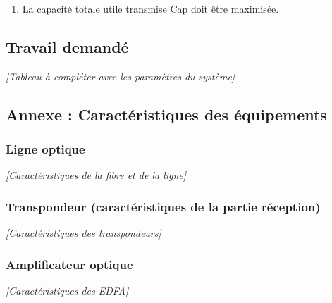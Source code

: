 \documentclass[a4paper,11pt]{article}
\begin{document}
\begin{enumerate}
    \item La capacité totale utile transmise Cap doit être maximisée.
\end{enumerate}

\subsection*{Travail demandé}

\textit{[Tableau à compléter avec les paramètres du système]}

\subsection*{Annexe : Caractéristiques des équipements}

\subsubsection*{Ligne optique}
\textit{[Caractéristiques de la fibre et de la ligne]}

\subsubsection*{Transpondeur (caractéristiques de la partie réception)}
\textit{[Caractéristiques des transpondeurs]}

\subsubsection*{Amplificateur optique}
\textit{[Caractéristiques des EDFA]}
\end{document}
